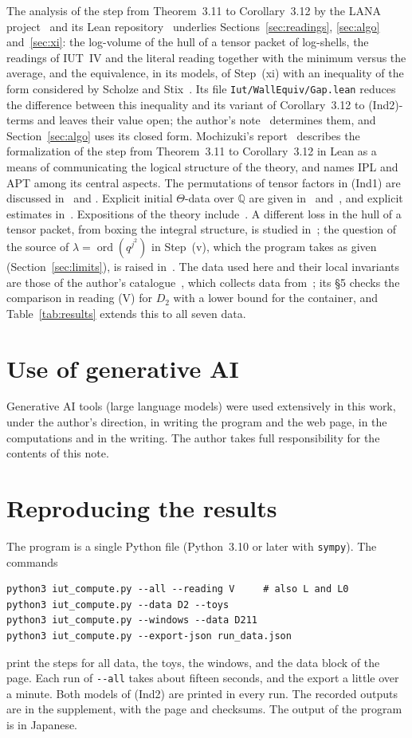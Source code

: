 \documentclass[11pt,a4paper]{article}
\newcommand{\Q}{\mathbb{Q}}
\newcommand{\ord}{\operatorname{ord}}
\begin{document}
The analysis of the step from Theorem~3.11 to Corollary~3.12 by the LANA project~\cite{LANA} and its Lean
repository~\cite{LANAiut} underlies Sections~\ref{sec:readings}, \ref{sec:algo} and~\ref{sec:xi}: the log-volume of the
hull of a tensor packet of log-shells, the readings of IUT~IV and the literal reading together with the minimum
versus the average, and the equivalence, in its models, of Step~(xi) with an inequality of the form considered by
Scholze and Stix~\cite{SS}. Its file \nolinkurl{Iut/WallEquiv/Gap.lean} reduces the difference between this
inequality and its variant of Corollary~3.12 to (Ind2)-terms and leaves their value open; the author's
note~\cite{Gap} determines them, and Section~\ref{sec:algo} uses its closed form. Mochizuki's report~\cite{Formal} describes the formalization of the step from
Theorem~3.11 to Corollary~3.12 in Lean as a means of communicating the logical structure of the theory, and names IPL
and APT among its central aspects. The permutations of tensor factors in (Ind1) are discussed
in~\cite[\S4]{DH1} and \cite[\S6.2, footnote~7]{DH}. Explicit initial $\Theta$-data over $\Q$ are given
in~\cite[\S2.10]{DH1} and~\cite{Zhou1,Zhou2}, and explicit estimates in~\cite{MFHMP}. Expositions of the theory
include~\cite{Hoshi1,Hoshi2,Yamashita}. A different loss in the hull of a tensor packet, from boxing the integral
structure, is studied in~\cite{Zeng}; the question of the source of $\lambda=\ord(q^{j^2})$ in Step~(v), which the
program takes as given (Section~\ref{sec:limits}), is raised in~\cite{Takkun}. The data used here and their local
invariants are those of the author's catalogue~\cite{Cat}, which collects data from~\cite{First,Second,Note}; its
\S5 checks the comparison in reading (V) for $D_2$ with a lower bound for the container, and Table~\ref{tab:results}
extends this to all seven data.

\section*{Use of generative AI}
Generative AI tools (large language models) were used extensively in this work, under the author's direction, in
writing the program and the web page, in the computations and in the writing. The author takes full responsibility
for the contents of this note.

\appendix
\section{Reproducing the results}\label{app:repro}
The program is a single Python file (Python~3.10 or later with \texttt{sympy}). The commands
\begin{verbatim}
python3 iut_compute.py --all --reading V     # also L and L0
python3 iut_compute.py --data D2 --toys
python3 iut_compute.py --windows --data D211
python3 iut_compute.py --export-json run_data.json
\end{verbatim}
print the steps for all data, the toys, the windows, and the data block of the page. Each run of \texttt{-{}-all} takes
about fifteen seconds, and the export a little over a minute. Both models of (Ind2) are printed in every run. The recorded outputs are in the supplement, with the page and checksums.
The output of the program is in Japanese.
\end{document}
